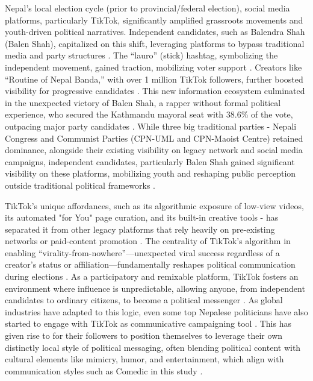 \documentclass[12pt,a4paper]{report}
\begin{document}
Nepal's local election cycle (prior to provincial/federal election), social media platforms, particularly TikTok, significantly amplified grassroots movements and youth-driven political narratives. Independent candidates, such as Balendra Shah (Balen Shah), capitalized on this shift, leveraging platforms to bypass traditional media and party structures \parencite{DW2022NepalElections}. The ``lauro'' (stick) hashtag, symbolizing the independent movement, gained traction, mobilizing voter support \parencite{AnnapurnaExpress2022}. Creators like ``Routine of Nepal Banda,'' with over 1 million TikTok followers, further boosted visibility for progressive candidates \parencite{dahal2023influence}. This new information ecosystem culminated in the unexpected victory of Balen Shah, a rapper without formal political experience, who secured the Kathmandu mayoral seat with 38.6\% of the vote, outpacing major party candidates \parencite{wikipedia2022local}. While three big traditional parties - Nepali Congress and Communist Parties (CPN-UML and CPN-Maoist Centre) retained dominance, alongside their existing visibility on legacy network and social media campaigns, independent candidates, particularly  Balen Shah gained significant visibility on these platforms, mobilizing youth and reshaping public perception outside traditional political frameworks \parencite{DW2022NepalElections}.

TikTok's unique affordances, such as its algorithmic exposure of low-view videos, its automated "for You" page curation, and its built-in creative tools - has separated it from other legacy platforms that rely heavily on pre-existing networks or paid-content promotion \parencite{guinaudeau2022fifteen}. The centrality of TikTok’s algorithm in enabling ``virality-from-nowhere''—unexpected viral success regardless of a creator’s status or affiliation—fundamentally reshapes political communication during elections \parencite{guinaudeau2022fifteen}. As a participatory and remixable platform, TikTok fosters an environment where influence is unpredictable, allowing anyone, from independent candidates to ordinary citizens, to become a political messenger \parencite{guinaudeau2022fifteen}. As global industries have adapted to this logic, even some top Nepalese politicians have also started to engage with TikTok as communicative campaigning tool \parencite{himalayantimes2025oli}. This has given rise to for their followers to position themselves to leverage their own distinctly local style of political messaging, often blending political content with cultural elements like mimicry, humor, and entertainment, which align with communication styles such as Comedic in this study \parencite{umansky2023dances}. 
\end{document}
